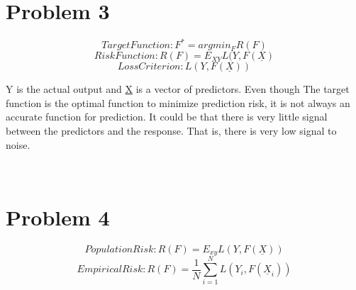 \documentclass[11pt]{article}
\begin{document}
\begin{center}
\ \\
\end{center}

\section*{Problem 3}

$$Target Function: F^* = argmin_FR(F)$$
$$Risk Function: R(F) = E_{XY}L(Y, F(\underline{X})$$
$$Loss Criterion: L(Y,F(\underline{X}))$$

\vspace{5 mm}
\noindent
Y is the actual output and \underline{X} is a vector of predictors. Even though 
The target function is the optimal function to minimize prediction risk, it is 
not always an accurate function for prediction. It could be that there is very 
little signal between the predictors and the response. That is, there is very 
low signal to noise.

\newpage
\begin{center}
\ \\
\end{center}

\section*{Problem 4}

$$Population Risk: R(F) = E_{xy}L(Y,F(\underline{X}))$$
$$ Empirical Risk: R(F) = \frac{1}{N}\sum_{i=1}^NL(Y_i, F(\underline{X}_i))$$ 
\end{document}
